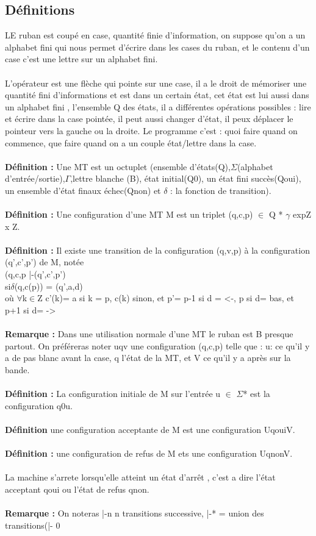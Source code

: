 \documentclass{article}
\begin{document}
\subsection{Définitions} LE ruban est coupé en case, quantité finie d'information, on suppose qu'on a un alphabet fini qui nous permet d'écrire dans les cases du ruban, et le contenu d'un case c'est une lettre sur un alphabet fini.\\\\L’opérateur est une flèche qui pointe sur une case, il a le droit de mémoriser une quantité fini d'informations et est dans un certain état, cet état est lui aussi dans un alphabet fini , l'ensemble Q des états, il a différentes opérations possibles : lire et écrire dans la case pointée, il peut aussi changer d'état, il peux déplacer le pointeur vers la gauche ou la droite. Le programme c'est  : quoi faire quand on commence, que faire quand on a un couple état/lettre dans la case.\\\\\textbf{Définition : }Une MT est un octuplet (ensemble d'états(Q),$\Sigma$(alphabet d'entrée/sortie),$\Gamma$,lettre blanche (B), état initial(Q0), un état fini succès(Qoui), un ensemble d'état finaux échec(Qnon) et $\delta$ : la fonction de transition).\\\\\textbf{Définition : } Une configuration d'une MT M est un triplet (q,c,p) $\in$ Q * $\gamma$ exp{Z} x Z.\\\\\textbf{Définition : } Il existe une transition de la configuration (q,v,p) à la configuration (q',c',p') de M, notée \\(q,c,p |-(q',c',p')\\si$\delta$(q,c(p)) = (q',a,d)\\où $\forall$k$\in$Z c'(k)= a si k = p, c(k) sinon, et p'=  p-1 si d = <-, p si d= bas, et p+1 si d= ->\\\\\textbf{Remarque : }Dans une utilisation normale d'une MT le ruban est B presque partout. On préféreras noter uqv une configuration (q,c,p) telle que : u: ce qu'il y a de pas blanc avant la case, q l'état de la MT, et V ce qu'il y a après sur la bande.\\\\\textbf{Définition : } La configuration initiale de M sur l'entrée u $\in$ $\Sigma$* est la configuration q0u.\\\\\textbf{Définition} une configuration acceptante de M est une configuration UqouiV.\\\\\textbf{Définition : }une configuration de refus de M ets une configuration UqnonV.\\\\La machine s'arrete lorsqu'elle atteint un état d’arrêt , c’est a dire l'état acceptant qoui ou l'état de refus qnon.\\\\\textbf{Remarque : }On noteras |-n n transitions successive, |-* = union des transitions(|- 0 
\end{document}
